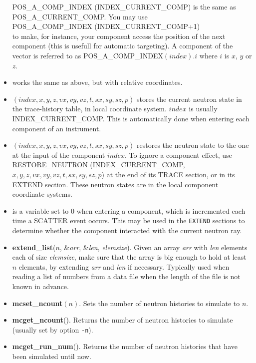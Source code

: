 \begin{itemize}
  POS\_A\_COMP\_INDEX (INDEX\_CURRENT\_COMP) is the same as \\
  POS\_A\_CURRENT\_COMP. You may use \\
  POS\_A\_COMP\_INDEX  (INDEX\_CURRENT\_COMP+1) \\
  to make, for instance, your
  component access the position of the next component (this is usefull for
  automatic targeting).  A component of the vector is referred to as
  POS\_A\_COMP\_INDEX$(index).i$ where $i$ is $x$, $y$ or $z$.
\item {} works the same as above,
  but with relative coordinates.
\item {}$(index, x, y, z, vx, vy, vz, t, sx, sy,
sz, p)$ stores the current neutron state in the trace-history table,
in local coordinate system. $index$ is usually INDEX\_CURRENT\_COMP.
This is automatically done when entering each component of an
instrument.
\item {}$(index, x, y, z, vx, vy, vz, t, sx, sy,
sz, p)$ restores the neutron state to the one at the input of the
component $index$. To ignore a component effect, use
RESTORE\_NEUTRON (INDEX\_CURRENT\_COMP, \\
$x, y, z, vx, vy, vz, t,
sx, sy, sz, p$) at the end of its TRACE section, or in its EXTEND
section. These neutron states are in the local component coordinate
systems.
\item {} is a variable set to 0 when entering
  a component, which is incremented each time a SCATTER event occurs.
  This may be used in the \verb+EXTEND+ sections to determine whether
  the component interacted with the current neutron ray.
\item \textbf{extend\_list}($n$, \&\textit{arr}, \&\textit{len},
  \textit{elemsize}). Given an array \textit{arr} with \textit{len}
  elements each of size \textit{elemsize}, make sure that the array is
  big enough to hold at least $n$ elements, by extending \textit{arr}
  and \textit{len} if necessary. Typically used when reading a list of
  numbers from a data file when the length of the file is not known in advance.
\item \textbf{mcset\_ncount}$(n)$. Sets the number of neutron histories to simulate to $n$.
\item \textbf{mcget\_ncount}(). Returns the number of neutron histories to simulate (usually set by option \verb+-n+).
\item \textbf{mcget\_run\_num}(). Returns the number of neutron histories that have been simulated until now.
\end{itemize}

